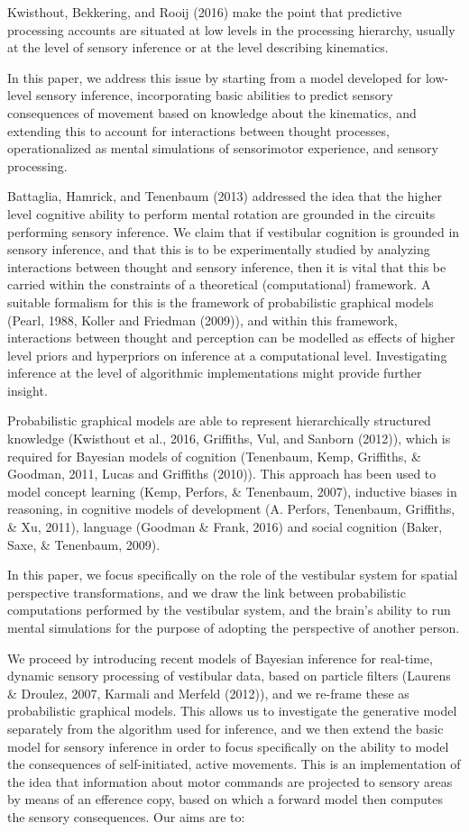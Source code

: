 \documentclass[english,floatsintext,man]{apa6}
\theoremstyle{definition}
\theoremstyle{definition}
\theoremstyle{remark}
\begin{document}
Kwisthout, Bekkering, and Rooij (2016) make the point that predictive
processing accounts are situated at low levels in the processing
hierarchy, usually at the level of sensory inference or at the level
describing kinematics.

In this paper, we address this issue by starting from a model developed
for low-level sensory inference, incorporating basic abilities to
predict sensory consequences of movement based on knowledge about the
kinematics, and extending this to account for interactions between
thought processes, operationalized as mental simulations of sensorimotor
experience, and sensory processing.

Battaglia, Hamrick, and Tenenbaum (2013) addressed the idea that the
higher level cognitive ability to perform mental rotation are grounded
in the circuits performing sensory inference. We claim that if
vestibular cognition is grounded in sensory inference, and that this is
to be experimentally studied by analyzing interactions between thought
and sensory inference, then it is vital that this be carried within the
constraints of a theoretical (computational) framework. A suitable
formalism for this is the framework of probabilistic graphical models
(Pearl, 1988, Koller and Friedman (2009)), and within this framework,
interactions between thought and perception can be modelled as effects
of higher level priors and hyperpriors on inference at a computational
level. Investigating inference at the level of algorithmic
implementations might provide further insight.

Probabilistic graphical models are able to represent hierarchically
structured knowledge (Kwisthout et al., 2016, Griffiths, Vul, and
Sanborn (2012)), which is required for Bayesian models of cognition
(Tenenbaum, Kemp, Griffiths, \& Goodman, 2011, Lucas and Griffiths
(2010)). This approach has been used to model concept learning (Kemp,
Perfors, \& Tenenbaum, 2007), inductive biases in reasoning, in
cognitive models of development (A. Perfors, Tenenbaum, Griffiths, \&
Xu, 2011), language (Goodman \& Frank, 2016) and social cognition
(Baker, Saxe, \& Tenenbaum, 2009).

In this paper, we focus specifically on the role of the vestibular
system for spatial perspective transformations, and we draw the link
between probabilistic computations performed by the vestibular system,
and the brain's ability to run mental simulations for the purpose of
adopting the perspective of another person.

We proceed by introducing recent models of Bayesian inference for
real-time, dynamic sensory processing of vestibular data, based on
particle filters (Laurens \& Droulez, 2007, Karmali and Merfeld (2012)),
and we re-frame these as probabilistic graphical models. This allows us
to investigate the generative model separately from the algorithm used
for inference, and we then extend the basic model for sensory inference
in order to focus specifically on the ability to model the consequences
of self-initiated, active movements. This is an implementation of the
idea that information about motor commands are projected to sensory
areas by means of an efference copy, based on which a forward model then
computes the sensory consequences. Our aims are to:
\end{document}

